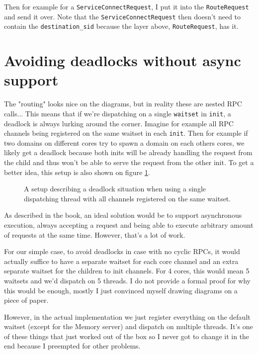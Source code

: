 Then for example for a \texttt{ServiceConnectRequest}, I put it into the \texttt{RouteRequest} and send it over. Note that the \texttt{ServiceConnectRequest} then doesn't need to contain the \texttt{destination_sid} because the layer above, \texttt{RouteRequest}, has it.

\section{Avoiding deadlocks without async support}
The "routing" looks nice on the diagrams, but in reality these are nested RPC calls... This means that if we're dispatching on a single \texttt{waitset} in \texttt{init}, a deadlock is always lurking around the corner. Imagine for example all RPC channels being registered on the same waitset in each  \texttt{init}. Then for example if two domains on different cores try to spawn a domain on each others cores, we likely get a deadlock because both inits will be already handling the request from the child and thus won't be able to serve the request from the other init. To get a better idea, this setup is also shown on figure \ref{fig:ns_deadlock}.

\begin{figure}[ht]
    \centering
        \scalebox{0.7}{}
    \caption{A setup describing a deadlock situation when using a single dispatching thread with all channels registered on the same waitset.}
    \label{fig:ns_deadlock}
\end{figure}

As described in the book, an ideal solution would be to support asynchronous execution, always accepting a request and being able to execute arbitrary amount of requests at the same time. However, that's a lot of work.

For our simple case, to avoid deadlocks in case with no cyclic RPCs, it would actually suffice to have a separate waitset for each core channel and an extra separate waitset for the children to init channels. For 4 cores, this would mean 5 waitsets and we'd dispatch on 5 threads. I do not provide a formal proof for why this would be enough, mostly I just convinced myself drawing diagrams on a piece of paper.

However, in the actual implementation we just register everything on the default waitset (except for the Memory server) and dispatch on multiple threads. It's one of these things that just worked out of the box so I never got to change it in the end because I preempted for other problems.

